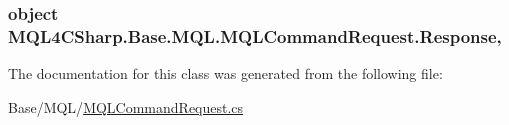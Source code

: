 \subsubsection[{\texorpdfstring{Response}{Response}}]{\setlength{\rightskip}{0pt plus 5cm}object M\+Q\+L4\+C\+Sharp.\+Base.\+M\+Q\+L.\+M\+Q\+L\+Command\+Request.\+Response\hspace{0.3cm}{\ttfamily [get]}, {\ttfamily [set]}}\hypertarget{class_m_q_l4_c_sharp_1_1_base_1_1_m_q_l_1_1_m_q_l_command_request_ae3f556839c2657587b3f63b65cae2477}{}\label{class_m_q_l4_c_sharp_1_1_base_1_1_m_q_l_1_1_m_q_l_command_request_ae3f556839c2657587b3f63b65cae2477}


The documentation for this class was generated from the following file\+:\begin{DoxyCompactItemize}
\item 
Base/\+M\+Q\+L/\hyperlink{_m_q_l_command_request_8cs}{M\+Q\+L\+Command\+Request.\+cs}\end{DoxyCompactItemize}
